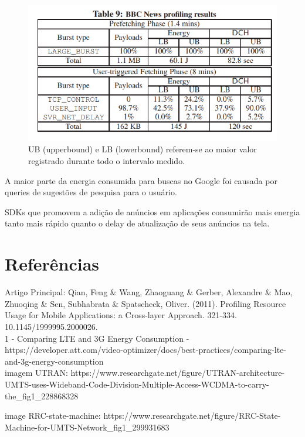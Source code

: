 \documentclass{article}
\begin{document}
\begin{figure}[!h]
\includegraphics[width=\textwidth]{tabela-bbc-news}
\caption{UB (upperbound) e LB (lowerbound) referem-se ao maior valor registrado durante todo o intervalo medido.}
\centering
\end{figure}


A maior parte da energia consumida para buscas no Google foi causada por queries de sugestões de pesquisa para o
usuário.

SDKs que promovem a adição de anúncios em aplicações consumirão mais energia tanto mais rápido quanto o delay de
atualização de seus anúncios na tela.

\section{Referências}
Artigo Principal: Qian, Feng \& Wang, Zhaoguang \& Gerber, Alexandre \& Mao, Zhuoqing \& Sen, Subhabrata \& Spatscheck,
Oliver. (2011). Profiling Resource Usage for Mobile Applications: a Cross-layer Approach. 321-334.
10.1145/1999995.2000026. \\
1 - Comparing LTE and 3G Energy Consumption -
https://developer.att.com/video-optimizer/docs/best-practices/comparing-lte-and-3g-energy-consumption \\

imagem UTRAN: https://www.researchgate.net/figure/UTRAN-architecture-UMTS-uses-Wideband-Code-Division-Multiple-Access-WCDMA-to-carry-the\_fig1\_228868328

image RRC-state-machine: https://www.researchgate.net/figure/RRC-State-Machine-for-UMTS-Network\_fig1\_299931683
\end{document}
